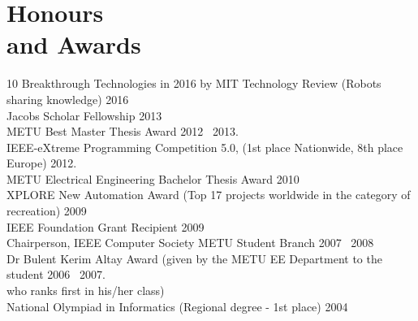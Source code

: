 
\section{\mysidestyle \textcolor{olgray}{Honours \\and Awards}}
10 Breakthrough Technologies in 2016 by MIT Technology Review (Robots sharing knowledge) \hfill 2016 \vspace{1mm}\\
Jacobs Scholar Fellowship \hfill 2013 \vspace{1mm}\\
METU Best Master Thesis Award \hfill  2012 \textendash ~2013{\color{white}.}\vspace{1mm}\\
IEEE-eXtreme Programming Competition 5.0,  (1st place Nationwide, 8th place Europe) \hfill 2012{\color{white}.}\vspace{1mm}\\
METU Electrical Engineering Bachelor Thesis Award  \hfill 2010 \vspace{1mm}\vspace{1mm}\\
XPLORE New Automation Award (Top 17 projects worldwide in the category of recreation)  \hfill 2009 \vspace{1mm}\vspace{1mm}\\
IEEE Foundation Grant Recipient \hfill 2009 \vspace{1mm}\vspace{1mm}\\
Chairperson, IEEE Computer Society METU Student Branch \hfill 2007 \textendash ~2008 \vspace{1mm}\vspace{1mm} \\
Dr Bulent Kerim Altay Award  (given by the METU EE Department to the student \hfill 2006 \textendash ~2007{\color{white}.}\\ who ranks first in his/her class) \vspace{1mm}\vspace{1mm}\\
National Olympiad in Informatics (Regional degree - 1st place) \hfill 2004 \vspace{1mm}\vspace{1mm}\\
\vspace{-4mm}
